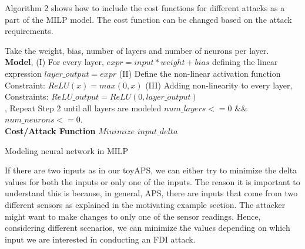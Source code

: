 Algorithm 2 shows how to include the cost functions for different attacks as a part of the MILP model. The cost function can be changed based on the attack requirements. 
\begin{algorithm}
	Take the weight, bias, number of layers and number of neurons per layer. \\
	
	\textbf{Model}, \linebreak
	(I) For every  layer,  $expr = input * weight + bias$
	\linebreak 
	defining the linear expression
	\linebreak
	$layer\_output = expr$
	\linebreak
	(II) Define the non-linear activation function 
	\linebreak 
	\qquad Constraint: $ReLU(x) = max (0,x)$
	\linebreak
	(III) Adding non-linearity to every layer,
	\linebreak
	Constraints: $ReLU\_output = ReLU(0, layer\_output)$\\, 
	Repeat Step 2 until all layers are modeled 
	\linebreak
	$num\_layers < = 0$   $ \&\& $ 
	$ num\_neurons < = 0 $.\\
	
	\textbf{Cost/Attack Function} \linebreak
	$Minimize $  $input\_delta$
	\caption{Modeling neural network in MILP}
	\label{algo:b}
\end{algorithm}

If there are two inputs as in our toyAPS, we can either try to minimize the delta values for both the inputs or only one of the inputs. The reason it is important to understand this is because, in general, APS, there are inputs that come from two different sensors as explained in the motivating example section. %
The attacker might want to make changes to only one of the sensor readings. Hence, considering different scenarios, we can minimize the values depending on which input we are interested in conducting an FDI attack. 

